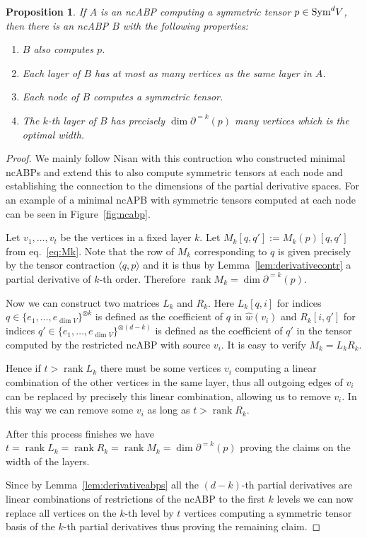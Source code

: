 \documentclass[10pt,a4paper]{article}
\numberwithin{equation}{section}
\newtheorem{proposition}[equation]{Proposition}
\theoremstyle{definition}
\newcommand{\Sym}{\textup{Sym}}
\DeclareMathOperator{\rank}{rank}
\begin{document}
\begin{proposition}
    \label{prop:minimalsym}
    If $A$ is an ncABP computing a symmetric tensor $p \in \Sym^d V$, then there is an ncABP $B$ with the following properties:
    \begin{enumerate}
        \item $B$ also computes $p$.
        \item Each layer of $B$ has at most as many vertices as the same layer in $A$.
        \item Each node of $B$ computes a symmetric tensor.
        \item The $k$-th layer of $B$ has precisely $\dim\partial^{=k}(p)$ many vertices which is the optimal width.
    \end{enumerate}
\end{proposition}
\begin{proof}
    We mainly follow Nisan \cite{nisan1991lower} with this contruction who constructed minimal ncABPs and extend this to also compute symmetric tensors at each node and establishing the connection to the dimensions of the partial derivative spaces.
    For an example of a minimal ncAPB with symmetric tensors computed at each node can be seen in Figure~\ref{fig:ncabp}.

    Let $v_1, \ldots, v_t$ be the vertices in a fixed layer $k$. Let $M_k[q, q'] := M_k(p)[q,q']$ from eq.~\eqref{eq:Mk}.
    Note that the row of $M_k$ corresponding to $q$ is given precisely by the tensor contraction $\langle q, p \rangle$ and it is thus by Lemma~\ref{lem:derivativecontr} a partial derivative of $k$-th order.
    Therefore $\rank M_k = \dim \partial^{=k}(p)$.

    Now we can construct two matrices $L_k$ and $R_k$.
    Here $L_k[q, i]$ for indices $q \in \{e_1, \dots, e_{\dim V}\}^{\otimes k}$ is defined as the coefficient of $q$ in $\hat{w}(v_i)$ and $R_k[i, q']$ for indices $q' \in \{e_1, \dots, e_{\dim V}\}^{\otimes (d-k)}$ is defined as the coefficient of $q'$ in the tensor computed by the restricted ncABP with source $v_i$.
    It is easy to verify $M_k = L_k R_k$.

    Hence if $t > \rank L_k$ there must be some vertices $v_i$ computing a linear combination of the other vertices in the same layer, thus all outgoing edges of $v_i$ can be replaced by precisely this linear combination, allowing us to remove $v_i$.
    In this way we can remove some $v_i$ as long as $t > \rank R_k$.

    After this process finishes we have $t = \rank L_k = \rank R_k = \rank M_k = \dim \partial^{=k}(p)$ proving the claims on the width of the layers.

    Since by Lemma~\ref{lem:derivativeabps} all the $(d-k)$-th partial derivatives are linear combinations of restrictions of the ncABP to the first $k$ levels we can now replace all vertices on the $k$-th level by $t$ vertices computing a symmetric tensor basis of the $k$-th partial derivatives thus proving the remaining claim.
\end{proof}
\end{document}
